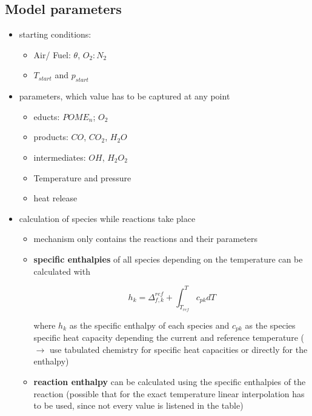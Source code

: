 \documentclass[12pt,oneside,a4paper,english]{article}
\begin{document}
\subsection{Model parameters} %
\begin{itemize}
\item{starting conditions:}

	\begin{itemize}
	\item{Air/ Fuel: $\theta$, $O_2:N_2$}
	\item{$T_{start}$ and $p_{start}$}
	\end{itemize}

\item{parameters, which value has to be captured at any point}

	\begin{itemize}
	\item{educts: $POME_n$; $O_2$}
	\item{products: $CO$, $CO_2$, $H_2O$}
	\item{intermediates: $OH$, $H_2O_2$}
	\item{Temperature and pressure}
	\item{heat release}
	\end{itemize}

\item{calculation of species while reactions take place}
	
	\begin{itemize}
	\item{mechanism only contains the reactions and their parameters}
	\item{\textbf{specific enthalpies} of all species depending on the temperature can be calculated with 
	
	\begin{equation}
	h_k = \Delta_{f,k}^{ref} + \int_{T_{ref}}^T c_{pk}dT
	\end{equation}
	
	where $h_k$ as the specific enthalpy of each species  and $c_{pk}$ as the species specific heat capacity depending the current and reference temperature ($\rightarrow$ use tabulated chemistry for specific heat capacities or directly for the enthalpy)}
	
	\item{\textbf{reaction enthalpy} can be calculated using the specific enthalpies of the reaction (possible that for the exact temperature linear interpolation has to be used, since not every value is listened in the table)
	
}
\end{itemize}
\end{itemize}
\end{document}

